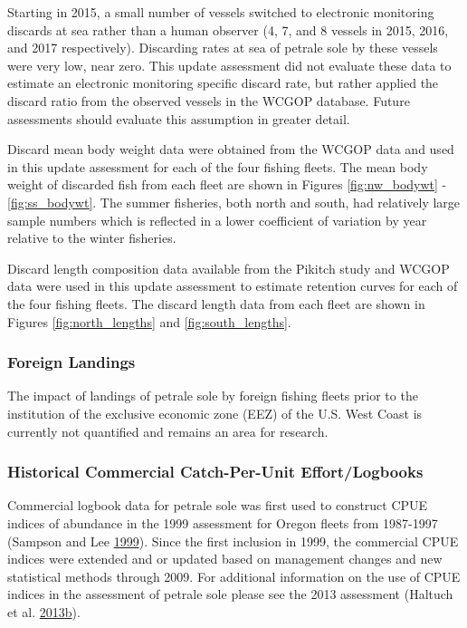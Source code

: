 \documentclass[12pt,]{article}
\begin{document}
Starting in 2015, a small number of vessels switched to electronic
monitoring discards at sea rather than a human observer (4, 7, and 8
vessels in 2015, 2016, and 2017 respectively). Discarding rates at sea
of petrale sole by these vessels were very low, near zero. This update
assessment did not evaluate these data to estimate an electronic
monitoring specific discard rate, but rather applied the discard ratio
from the observed vessels in the WCGOP database. Future assessments
should evaluate this assumption in greater detail.

Discard mean body weight data were obtained from the WCGOP data and used
in this update assessment for each of the four fishing fleets. The mean
body weight of discarded fish from each fleet are shown in Figures
\ref{fig:nw_bodywt} - \ref{fig:ss_bodywt}. The summer fisheries, both
north and south, had relatively large sample numbers which is reflected
in a lower coefficient of variation by year relative to the winter
fisheries.

Discard length composition data available from the Pikitch study and
WCGOP data were used in this update assessment to estimate retention
curves for each of the four fishing fleets. The discard length data from
each fleet are shown in Figures \ref{fig:north_lengths} and
\ref{fig:south_lengths}.

\subsubsection{Foreign Landings}\label{foreign-landings}

The impact of landings of petrale sole by foreign fishing fleets prior
to the institution of the exclusive economic zone (EEZ) of the U.S. West
Coast is currently not quantified and remains an area for research.

\subsubsection{Historical Commercial Catch-Per-Unit
Effort/Logbooks}\label{historical-commercial-catch-per-unit-effortlogbooks}

Commercial logbook data for petrale sole was first used to construct
CPUE indices of abundance in the 1999 assessment for Oregon fleets from
1987-1997 (Sampson and Lee
\protect\hyperlink{ref-sampson_assessment_1999}{1999}). Since the first
inclusion in 1999, the commercial CPUE indices were extended and or
updated based on management changes and new statistical methods through
2009. For additional information on the use of CPUE indices in the
assessment of petrale sole please see the 2013 assessment (Haltuch et
al.
\protect\hyperlink{ref-haltuch_status_2013}{2013}\protect\hyperlink{ref-haltuch_status_2013}{b}).
\end{document}
